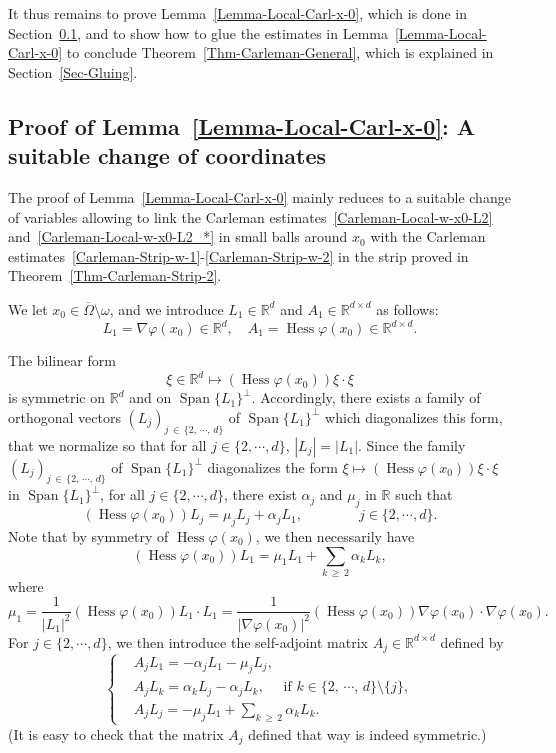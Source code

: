 \documentclass[AHL,Unicode,longabstracts]{cedram}
\newcommand*\R{\mathbb{R}}
\newcommand*\ds{\displaystyle}
\renewcommand{\geq}{\geqslant}
\DeclareMathOperator{\Hess}{Hess}
\DeclareMathOperator{\Span}{Span}
\begin{document}
It thus remains to prove Lemma~\ref{Lemma-Local-Carl-x-0}, which is done in Section~\ref{Subsec-Proof-Local-Carl}, and to show how to glue the estimates in Lemma~\ref{Lemma-Local-Carl-x-0} to conclude Theorem~\ref{Thm-Carleman-General}, which is explained in Section~\ref{Sec-Gluing}.

\subsection{Proof of Lemma~\ref{Lemma-Local-Carl-x-0}: A suitable change of coordinates}\label{Subsec-Proof-Local-Carl}

The proof of Lemma~\ref{Lemma-Local-Carl-x-0} mainly reduces to a suitable change of variables allowing to link the Carleman estimates~\eqref{Carleman-Local-w-x0-L2} and~\eqref{Carleman-Local-w-x0-L2_*} in small balls around $x_0$ with the Carleman estimates~\eqref{Carleman-Strip-w-1}-\eqref{Carleman-Strip-w-2} in the strip proved in Theorem~\ref{Thm-Carleman-Strip-2}.

We let $x_0 \in \overline\Omega\setminus \omega$, and we introduce $L_1 \in \R^d$ and $A_1 \in \R^{d\times d}$ as follows:
\begin{equation*}
L_1 = \nabla \varphi(x_0) \in \R^d, \quad A_1 = \Hess \varphi(x_0) \in \R^{d\times d}.
\end{equation*}

The bilinear form
\[
\xi \in \R^d \mapsto (\Hess \varphi(x_0)) \xi \cdot \xi
\]
is symmetric on $\R^d$ and on $\Span \{L_1\}^\perp$. Accordingly, there exists a family of orthogonal vectors $(L_j)_{j\,\in\, \{2,\,\cdots,\,d\}} $ of $\Span \{L_1\}^\perp$ which diagonalizes this form, that we normalize so that for all $j \in \{2, \cdots, d\}$, $|L_j | = |L_1|$. Since the family $(L_j)_{j\, \in\,\{2,\, \cdots,\, d\} } $ of $\Span \{L_1\}^\perp$ diagonalizes the form $\xi \mapsto (\Hess \varphi(x_0)) \xi \cdot \xi$ in $\Span \{L_1\}^\perp$, for all $j \in \{2, \cdots, d\}$, there exist $\alpha_j $ and $\mu_j$ in $\R$ such that
\[
(\Hess \varphi(x_0)) L_j = \mu_j L_j + \alpha_j L_1, \qquad \qquad j \in \{2, \cdots, d\}.
\]
Note that by symmetry of $\Hess \varphi(x_0)$, we then necessarily have
\[
(\Hess \varphi(x_0)) L_1 = \mu_1 L_1 + \sum_{k\,\geq\,2} \alpha_k L_k,
\]
where
\[
\mu_1 = \frac{1}{|L_1|^2} (\Hess \varphi(x_0)) L_1 \cdot L_1 =
\frac{1}{|\nabla \varphi(x_0)|^2} (\Hess \varphi(x_0)) \nabla \varphi(x_0) \cdot \nabla \varphi(x_0).
\]
For $j \in \{2, \cdots, d\}$, we then introduce the self-adjoint matrix $A_j \in \R^{d \times d}$ defined by
\begin{equation}\label{Choices-A-j}
\left\{
\begin{array}{ll}
& \ds A_j L_1 = - \alpha_j L_1 - \mu_j L_j,
\\
& \ds A_j L_k = \alpha_k L_j - \alpha_j L_k, \quad \text{ if } k \in \{2,\, \cdots,\, d\}\setminus \{ j\},
\\
& \ds A_j L_j = - \mu_j L_1 + \sum_{k\,\geq\, 2} \alpha_k L_k.
\end{array}
\right.
\end{equation}
(It is easy to check that the matrix $A_j$ defined that way is indeed symmetric.)
\end{document}
